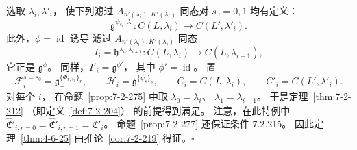 选取 $\lambda_i,\lambda'_i$，
使下列滤过
$A_{n'(\lambda_i),K'(\lambda_i)}$
同态对 $s_0=0,1$ 均有定义：
\begin{equation}
\mathfrak g^{\psi_{s_0},\lambda_i}\colon
C(L,\lambda_i)\longrightarrow C(L',\lambda'_i).
\tag{7.2.279}\label{eq:7-2-279}
\end{equation}
此外，$\phi=\operatorname{id}$ 诱导
滤过 $A_{n'(\lambda_i),K'(\lambda_i)}$
同态
\[
I_i=\mathfrak h^{\lambda_i,\lambda_{i+1}}\colon
C(L,\lambda_i)\longrightarrow C(L,\lambda_{i+1}),
\]
它正是 $\mathfrak g^\phi$。
同样，$I'_i=\mathfrak g^{\phi'}$，
其中 $\phi'=\operatorname{id}$。
置
\[
\mathcal F_i^{s=s_0}
=\mathfrak g_+^{\{\Phi_{r,s_0}\}_r},
\qquad
\mathcal H_i=\mathfrak g^{\{\psi_s\}_s},
\qquad
C_i=C(L,\lambda_i),\qquad
C'_i=C(L',\lambda'_i).
\]
对每个 $i$，
在命题~\ref{prop:7-2-275} 中取
$\lambda_0=\lambda_i$、
$\lambda_1=\lambda_{i+1}$。
于是定理~\ref{thm:7-2-212}
（即定义~\ref{def:7-2-204}）
的前提得到满足。
注意，在此特例中
$\widehat{\mathfrak C}'_{i,r=0}
=\widehat{\mathfrak C}'_{i,r=1}
=\mathfrak C'_i$。
命题~\ref{prop:7-2-277}
还保证条件 7.2.215。
因此定理~\ref{thm:4-6-25}
由推论~\ref{cor:7-2-219} 得证。\hfill$\square$
